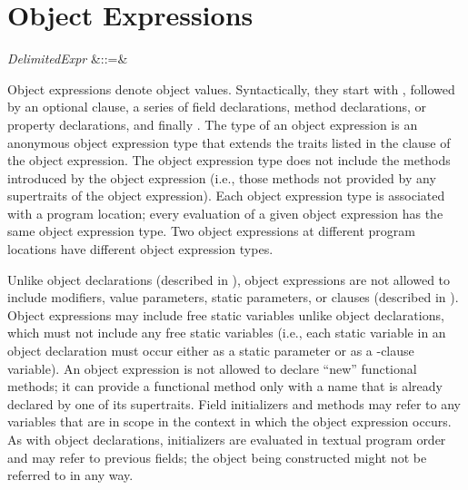 %
%
%
%

\section{Object Expressions}


\begin{Grammar}
\emph{DelimitedExpr} &::=&
    \\

\end{Grammar}

Object expressions denote object values.  Syntactically, they start
with , followed by an optional  clause, a
series of field declarations, method declarations,
or property declarations,
and finally .  The type of an object expression
is an anonymous object expression type that extends the traits listed in the
 clause of the object expression.  The object expression type does
not include the methods introduced by the object expression (i.e.,
those methods not provided by any supertraits of the object expression).
Each object expression type is associated with a program location;
every evaluation of a given object expression has the same
object expression type.  Two object expressions at different program locations
have different object expression types.


Unlike object declarations (described in ),
object expressions are not allowed to include
modifiers,
value parameters,
static parameters, or
 clauses (described in ).
Object expressions may include free static variables
unlike object declarations, which must
not include any free static variables (i.e., each static variable in
an object declaration must occur
either as a static parameter
or as a -clause variable).
An object expression is not allowed to declare ``new''
functional methods; it can provide a functional method
only with a name that is already declared by one of its supertraits.
Field initializers and methods may refer to any
variables that are in scope in the context in which the object
expression occurs.  As with object declarations, initializers are evaluated
in textual program order and may refer to previous fields; the object
being constructed might not be referred to in any way.


